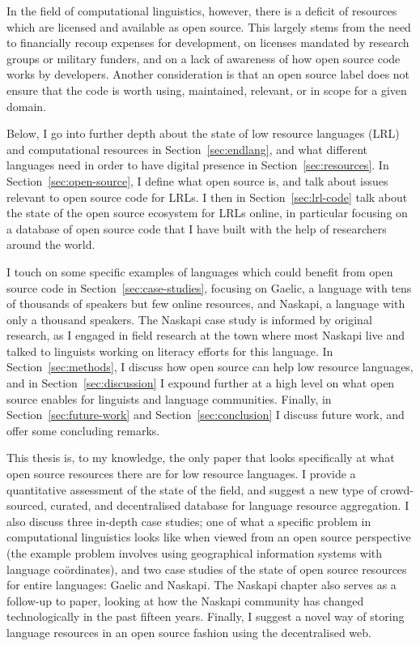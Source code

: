 In the field of computational linguistics, however, there is a deficit of resources which are licensed and available as open source. This largely stems from the need to financially recoup expenses for development, on licenses mandated by research groups or military funders, and on a lack of awareness of how open source code works by developers. Another consideration is that an open source label does not ensure that the code is worth using, maintained, relevant, or in scope for a given domain.

Below, I go into further depth about the state of low resource languages (LRL) and computational resources in Section~\ref{sec:endlang}, and what different languages need in order to have digital presence in Section~\ref{sec:resources}. In Section~\ref{sec:open-source}, I define what open source is, and talk about issues relevant to open source code for LRLs. I then in Section~\ref{sec:lrl-code} talk about the state of the open source ecosystem for LRLs online, in particular focusing on a database of open source code that I have built with the help of researchers around the world.

I touch on some specific examples of languages which could benefit from open source code in Section~\ref{sec:case-studies}, focusing on Gaelic, a language with tens of thousands of speakers but few online resources, and Naskapi, a language with only a thousand speakers. The Naskapi case study is informed by original research, as I engaged in field research at the town where most Naskapi live and talked to linguists working on literacy efforts for this language. In Section~\ref{sec:methods}, I discuss how open source can help low resource languages, and in Section~\ref{sec:discussion} I expound further at a high level on what open source enables for linguists and language communities. Finally, in Section~\ref{sec:future-work} and Section~\ref{sec:conclusion} I discuss future work, and offer some concluding remarks.


This thesis is, to my knowledge, the only paper that looks specifically at what open source resources there are for low resource languages. I provide a quantitative assessment of the state of the field, and suggest a new type of crowd-sourced, curated, and decentralised database for language resource aggregation. I also discuss three in-depth case studies; one of what a specific problem in computational linguistics looks like when viewed from an open source perspective (the example problem involves using geographical information systems with language co\"{o}rdinates), and two case studies of the state of open source resources for entire languages: Gaelic and Naskapi. The Naskapi chapter also serves as a follow-up to  paper, looking at how the Naskapi community has changed technologically in the past fifteen years. Finally, I suggest a novel way of storing language resources in an open source fashion using the decentralised web.
